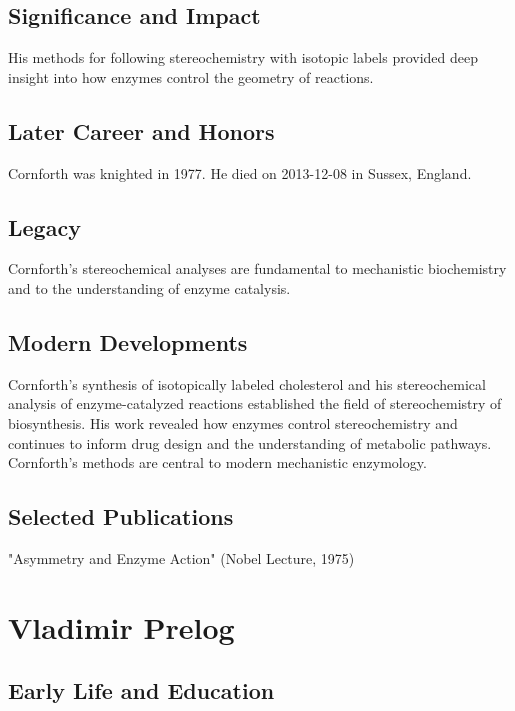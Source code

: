\subsection*{Significance and Impact}

His methods for following stereochemistry with isotopic labels provided deep insight into how enzymes control the geometry of reactions.

\subsection*{Later Career and Honors}

Cornforth was knighted in 1977. He died on 2013-12-08 in Sussex, England.

\subsection*{Legacy}

Cornforth's stereochemical analyses are fundamental to mechanistic biochemistry and to the understanding of enzyme catalysis.

\subsection*{Modern Developments}

Cornforth's synthesis of isotopically labeled cholesterol and his stereochemical analysis of enzyme-catalyzed reactions established the field of stereochemistry of biosynthesis. His work revealed how enzymes control stereochemistry and continues to inform drug design and the understanding of metabolic pathways. Cornforth's methods are central to modern mechanistic enzymology.

\subsection*{Selected Publications}

"Asymmetry and Enzyme Action" (Nobel Lecture, 1975)

\clearpage

\section{Vladimir Prelog}

\subsection*{Early Life and Education}

